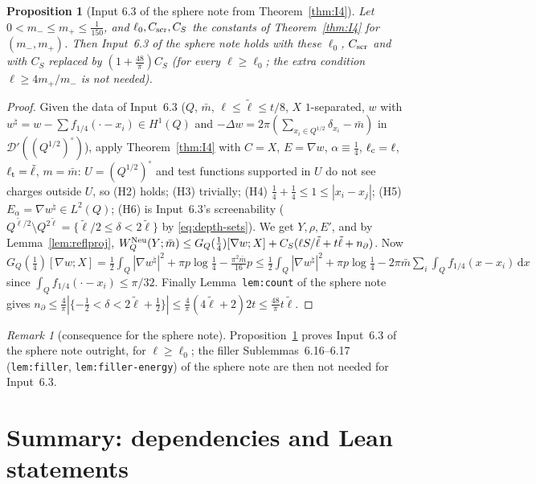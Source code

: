 \documentclass[11pt]{article}
\newtheorem{proposition}[theorem]{Proposition}
\theoremstyle{definition}
\theoremstyle{remark}
\newtheorem{remark}[theorem]{Remark}
\newcommand{\dd}{\,\mathrm d}
\newcommand{\dep}{\delta}
\newcommand{\lc}{\ell_{\rm c}}
\newcommand{\lt}{\ell_{\rm t}}
\begin{document}
\begin{proposition}[Input 6.3 of the sphere note from Theorem~\ref{thm:I4}]\label{prop:sphere}
Let $0<m_-\le m_+\le\frac1{150}$, and $\ell_0,C_{\rm scr},C_S$ the constants of Theorem~\ref{thm:I4} for $(m_-,m_+)$. Then Input~6.3 of the sphere note holds with these $\ell_0$,
$C_{\rm scr}$ and with $C_S$ replaced by $(1+\frac{48}\pi)C_S$ (for every $\ell\ge\ell_0$; the extra condition $\ell\ge4m_+/m_-$ is not needed).
\end{proposition}
\begin{proof}
Given the data of Input~6.3 ($Q$, $\bar m$, $\ell\le\tilde\ell\le t/8$, $X$ $1$-separated, $w$ with $w^\natural=w-\sum f_{1/4}(\cdot-x_i)\in H^1(Q)$ and
$-\Delta w=2\pi(\sum_{x_i\in Q^{1/2}}\delta_{x_i}-\bar m)$ in $\mathcal D'((Q^{1/2})^\circ)$), apply Theorem~\ref{thm:I4} with $C=X$, $E=\nabla w$, $\alpha\equiv\frac14$,
$\lc=\ell$, $\lt=\tilde\ell$, $m=\bar m$: $U=(Q^{1/2})^\circ$ and test functions supported in $U$ do not see charges outside $U$, so (H2) holds; (H3) trivially;
(H4) $\frac14+\frac14\le1\le|x_i-x_j|$; (H5) $E_\alpha=\nabla w^\natural\in L^2(Q)$; (H6) is Input~6.3's screenability ($Q^{\tilde\ell/2}\setminus Q^{2\tilde\ell}=\{\tilde\ell/2\le\dep<2\tilde\ell\}$ by
\eqref{eq:depth-sets}). We get $Y,\rho,E'$, and by Lemma~\ref{lem:reflproj},
$W^{\rm Neu}_Q(Y;\bar m)\le G_Q(\frac14)[\nabla w;X]+C_S(\ell S/\tilde\ell+t\tilde\ell+n_\partial)$. Now
$G_Q(\frac14)[\nabla w;X]=\frac12\int_Q|\nabla w^\natural|^2+\pi p\log\frac14-\frac{\pi^2\bar m}{16}p\le\frac12\int_Q|\nabla w^\natural|^2+\pi p\log\frac14-2\pi\bar m\sum_i\int_Qf_{1/4}(x-x_i)\dd x$
since $\int_Qf_{1/4}(\cdot-x_i)\le\pi/32$. Finally Lemma~\texttt{lem:count} of the sphere note gives $n_\partial\le\frac4\pi|\{-\frac12<\dep<2\tilde\ell+\frac12\}|\le\frac4\pi(4\tilde\ell+2)2t\le\frac{48}\pi t\tilde\ell$.
\end{proof}

\begin{remark}[consequence for the sphere note]
Proposition~\ref{prop:sphere} proves Input~6.3 of the sphere note outright, for $\ell\ge\ell_0$; the filler Sublemmas~6.16--6.17 (\texttt{lem:filler}, \texttt{lem:filler-energy}) of the sphere note are
then not needed for Input~6.3.
\end{remark}

\section{Summary: dependencies and Lean statements}\label{sec:summary}
\end{document}

